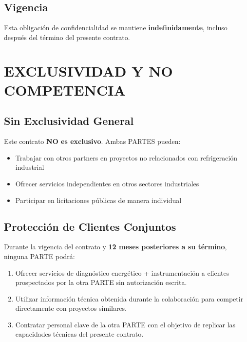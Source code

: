 \documentclass[11pt,letterpaper]{article}
\begin{document}
\subsection{Vigencia}

Esta obligación de confidencialidad se mantiene \textbf{indefinidamente}, incluso después del término del presente contrato.


\section{EXCLUSIVIDAD Y NO COMPETENCIA}

\subsection{Sin Exclusividad General}

Este contrato \textbf{NO es exclusivo}. Ambas PARTES pueden:
\begin{itemize}
    \item Trabajar con otros partners en proyectos no relacionados con refrigeración industrial
    \item Ofrecer servicios independientes en otros sectores industriales
    \item Participar en licitaciones públicas de manera individual
\end{itemize}

\subsection{Protección de Clientes Conjuntos}

Durante la vigencia del contrato y \textbf{12 meses posteriores a su término}, ninguna PARTE podrá:

\begin{enumerate}[label=\arabic*.]
    \item Ofrecer servicios de diagnóstico energético + instrumentación a clientes prospectados por la otra PARTE sin autorización escrita.
    
    \item Utilizar información técnica obtenida durante la colaboración para competir directamente con proyectos similares.
    
    \item Contratar personal clave de la otra PARTE con el objetivo de replicar las capacidades técnicas del presente contrato.
\end{enumerate}
\end{document}
